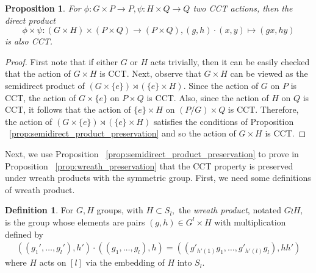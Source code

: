 \documentclass[10 pt]{amsart}
\theoremstyle{plain}
\newtheorem{prop}[thm]{Proposition}
\theoremstyle{definition}
\newtheorem{defn}[thm]{Definition}
\theoremstyle{remark}
\numberwithin{equation}{section}
\begin{document}
\begin{prop}
\label{prop:direct_product_preservation}
For $\phi:G\times P\rightarrow P,\psi:H \times Q \rightarrow Q$ two CCT actions, then the direct product 
$$\phi \times \psi:(G\times H)\times (P\times Q) \rightarrow (P\times Q),(g,h)\cdot (x,y) \mapsto (gx,hy)$$
is also CCT.
\end{prop}
\begin{proof}


First note that if either $G$ or $H$ acts trivially, then it can be easily checked that the action of $G\times H$ is CCT.  Next, observe that $G \times H$ can be viewed as the semidirect product of $(G\times \{e\}) \rtimes (\{e\} \times H).$ Since the action of $G$ on $P$ is CCT, the action of $G\times \{e\}$ on $P \times Q$ is CCT. Also, since the action of $H$ on $Q$ is CCT, it follows that the action of $\{e\}\times H$ on $(P/G) \times Q$ is CCT. Therefore, the action of $(G\times \{e\}) \rtimes (\{e\} \times H)$ satisfies the conditions of Proposition ~\ref{prop:semidirect_product_preservation} and so the action of $G\times H$ is CCT.
\end{proof}

Next, we use Proposition ~\ref{prop:semidirect_product_preservation} to prove in Proposition ~\ref{prop:wreath_preservation} that the CCT property is preserved under wreath products with the symmetric group. First, we need some definitions of wreath product.

\begin{defn}
For $G, H$ groups, with $H \subset S_l,$ the {\it wreath product}, notated $G \wr H,$ is the group whose elements are pairs $(g,h) \in G^l\times H$ with multiplication defined by
\begin{align*}
((g_1',\ldots, g_l'),h') \cdot ((g_1,\ldots, g_l) ,h) =((g'_{h'(1)}g_1,\ldots, g'_{h'(l)}g_l),hh')
\end{align*}
where $H$ acts on $[l]$ via the embedding of $H$ into $S_l$.
\end{defn}
\end{document}
